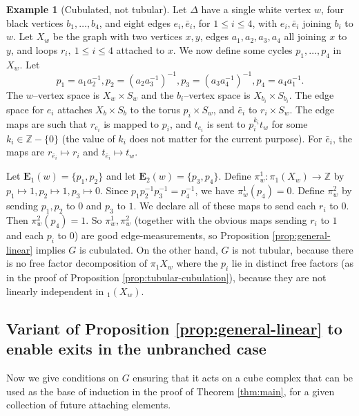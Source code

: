 \documentclass[11pt,oneside]{amsart}
\theoremstyle{definition}
\newtheorem{exmp}[thm]{Example}
\newcommand{\field}[1]{\mathbb{#1}}
\newcommand{\integers}{\ensuremath{\field{Z}}}
\begin{document}
\begin{exmp}[Cubulated, not tubular]\label{exmp:good-measurements-non-tubular}
Let $\Delta$ have a single white vertex $w$, four black vertices $b_1,\ldots,b_4$, and eight edges $e_i,\bar e_i$, for $1\leq i\leq 4$, with $e_i,\bar e_i$ joining $b_i$ to $w$.  Let $X_w$ be the graph with two vertices $x,y$, edges $a_1,a_2,a_3,a_4$ all joining $x$ to $y$, and loops $r_i,\ 1\leq i\leq 4$ attached to $x$. We now define some cycles $p_1,\ldots,p_4$ in $X_w$.  Let $$p_1=a_1a_2^{-1},p_2=(a_2a_3^{-1})^{-1},p_3=(a_3a_4^{-1})^{-1},p_4=a_4a_1^{-1}.$$  The $w$--vertex space is $X_w\times S_w$ and the $b_i$--vertex space is $X_{b_i}\times S_{b_i}$.  The edge space for $e_i$ attaches $X_b\times S_b$ to the torus $p_i\times S_w$, and $\bar e_i$ to $r_i\times S_w$.  The edge maps are such that $r_{e_i}$ is mapped to $p_i$, and $t_{e_i}$ is sent to $p_i^{k_i}t_w$ for some $k_i\in\integers-\{0\}$ (the value of $k_i$ does not matter for the current purpose).  For $\bar e_i$, the maps are $r_{\bar e_i}\mapsto r_i$ and $t_{\bar e_i}\mapsto t_w$.

Let $\mathbf E_1(w)=\{p_1,p_2\}$ and let $\mathbf E_2(w)=\{p_3,p_4\}$.  Define $\pi^1_w:\pi_1(X_w)\to\integers$ by $p_1\mapsto 1,p_2\mapsto 1,p_3\mapsto 0$.  Since $p_1p_2^{-1}p_3^{-1}=p_4^{-1}$, we have $\pi^1_w(p_4)=0$.  Define $\pi^2_w$ by sending $p_1,p_2$ to $0$ and $p_3$ to $1$.  We declare all of these maps to send each $r_i$ to $0$.  Then $\pi^2_w(p_4)=1$.  So $\pi^1_w,\pi_w^2$ (together with the obvious maps sending $r_i$ to $1$ and each $p_i$ to $0$) are good edge-measurements, so Proposition \ref{prop:general-linear} implies $G$ is cubulated. On the other hand, $G$ is not tubular, because there is no free factor decomposition of $\pi_1X_w$ where the $p_i$ lie in distinct free factors (as in the proof of Proposition \ref{prop:tubular-cubulation}), because they are not linearly independent in $_1(X_w)$. 
\end{exmp}


\subsection{Variant of Proposition \ref{prop:general-linear} to enable exits in the unbranched case}\label{subsec:exits}
Now we give conditions on $G$ ensuring that it acts on a cube complex that can be used as the base of induction in the proof of Theorem \ref{thm:main}, for a given collection of future attaching elements.
\end{document}
